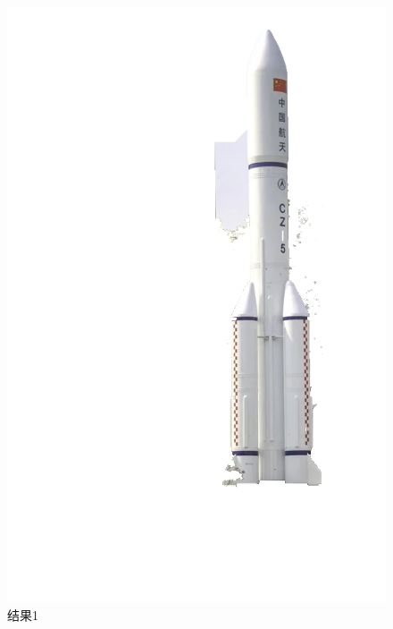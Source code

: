 \documentclass[12pt,a4paper]{article}
\begin{document}
\begin{CJK}{UTF8}{gbsn}
\begin{sloppypar}
\begin{figure}[H]
	\begin{minipage}{0.3\linewidth}
		\centering
		\includegraphics[width=0.9\linewidth]{P2_1}
		\caption{结果1}
		\label{f3}%
	\end{minipage}
	\begin{minipage}{0.3\linewidth}
		\centering

\end{minipage}
\end{figure}
\end{sloppypar}
\end{CJK}
\end{document}
